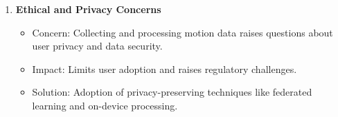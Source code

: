 \begin{enumerate}
    \item \textbf{Ethical and Privacy Concerns}
        \begin{itemize}
            \item Concern: Collecting and processing motion data raises questions about user privacy and data security.
            \item Impact: Limits user adoption and raises regulatory challenges.
            \item Solution: Adoption of privacy-preserving techniques like federated learning and on-device processing.
        \end{itemize}
\end{enumerate}







